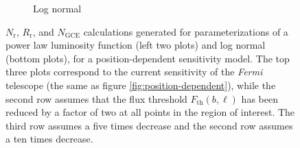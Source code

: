 \documentclass[a4paper,11pt]{article}
\begin{document}
\begin{figure}
\begin{subfigure}[h]{0.32\textwidth}
        \caption{Log normal}
        \label{fig:sens-log-normal}
    \end{subfigure}
    \caption{$N_\text{r}$, $R_\text{r}$, and $N_\text{GCE}$ calculations generated for parameterizations of a power law luminosity function (left two plots) and log normal (bottom plots), for a position-dependent sensitivity model. The top three plots correspond to the current sensitivity of the \textit{Fermi} telescope (the same as figure \ref{fig:position-dependent}), while the second row assumes that the flux threshold $F_\text{th}(b, \ell)$ has been reduced by a factor of two at all points in the region of interest. The third row assumes a five times decrease and the second row assumes a ten times decrease.}
    \label{fig:sensitivity-plots}
\end{figure}
\end{document}
